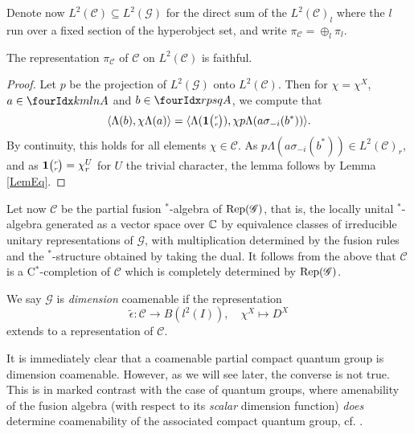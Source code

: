 Denote now $L^2(\mathcal{C})\subseteq L^2(\mathscr{G})$ for the direct sum of the $L^2(\mathcal{C})_l$ where the $l$ run over a fixed section of the hyperobject set, and write $\pi_{\mathcal{C}}= \oplus_l \pi_l$. 
 
\begin{Lem} The representation $\pi_{\mathcal{C}}$ of $\mathcal{C}$ on $L^2(\mathcal{C})$ is faithful.
\end{Lem} 

\begin{proof} Let $p$ be the projection of $L^2(\mathscr{G})$ onto $L^2(\mathcal{C})$. Then for $\chi = \chi^X$, $a\in \Gr{A}{k}{l}{m}{n}$ and $b\in \Gr{A}{r}{s}{p}{q}$, we compute that \[\langle \Lambda(b),\chi \Lambda(a)\rangle =  \langle \Lambda( \mathbf{1}{\tiny {\begin{pmatrix} r\\r\end{pmatrix}}}),\chi p\Lambda(a\sigma_{-i}(b^*))\rangle.\] By continuity, this holds for all elements $\chi \in \mathcal{C}$. As $p\Lambda(a\sigma_{-i}(b^*)) \in L^2(\mathcal{C})_r$, and as $\mathbf{1}{\tiny {\begin{pmatrix} r\\r\end{pmatrix}}} = \chi^U_r$ for $U$ the trivial character, the lemma follows by Lemma \ref{LemEq}.
\end{proof}

Let now $\mathscr{C}$ be the partial fusion $^*$-algebra of $\mathrm{Rep}(\mathscr{G})$, that is, the locally unital $^*$-algebra generated as a vector space over $\mathbb{C}$ by equivalence classes of irreducible unitary representations of $\mathscr{G}$, with multiplication determined by the fusion rules and the $^*$-structure obtained by taking the dual. It follows from the above that $\mathcal{C}$ is a C$^*$-completion of $\mathscr{C}$ which is completely determined by $\mathrm{Rep}(\mathscr{G})$.


\begin{Def} We say $\mathscr{G}$ is \emph{dimension} coamenable %
if the representation \[\tilde{\epsilon}: \mathscr{C} \rightarrow B(l^2(I)), \quad \chi^X \mapsto D^X\] extends to a representation of $\mathcal{C}$.
\end{Def}

It is immediately clear that a coamenable partial compact quantum group is dimension coamenable. However, as we will see later, the converse is not true. This is in marked contrast with the case of quantum groups, where amenability of the fusion algebra (with respect to its \emph{scalar} dimension function) \emph{does} determine coamenability of the associated compact quantum group, cf. \cite[Theorem 4.5]{Kye1}.
 
